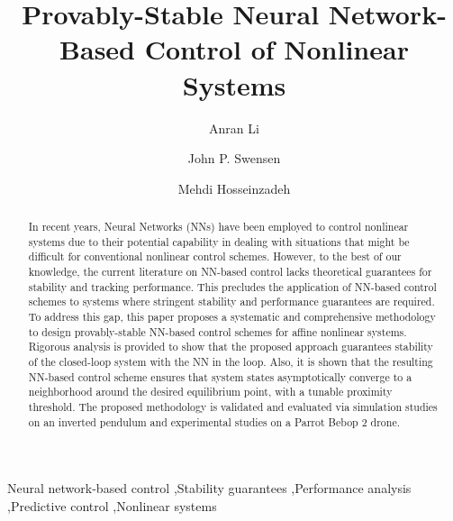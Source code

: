 \documentclass[1p,times]{elsarticle}
\begin{document}
\begin{frontmatter}

\title{Provably-Stable Neural Network-Based Control of Nonlinear Systems}



\author{Anran Li}


\author{John P. Swensen}


\author{Mehdi Hosseinzadeh}




\address{School of Mechanical and Materials Engineering, Washington State University, Pullman, WA 99164, USA}



\begin{abstract}
In recent years, Neural Networks (NNs) have been employed to control nonlinear systems due to their potential capability in dealing with situations that might be difficult for conventional nonlinear control schemes. However, to the best of our knowledge, the current literature on NN-based control lacks theoretical guarantees for stability and tracking performance. This precludes the application of NN-based control schemes to systems where stringent stability and performance guarantees are required. To address this gap, this paper proposes a systematic and comprehensive methodology to design provably-stable NN-based control schemes for affine nonlinear systems. Rigorous analysis is provided to show that the proposed approach guarantees stability of the closed-loop system with the NN in the loop. Also, it is shown that the resulting NN-based control scheme ensures that system states asymptotically converge to a neighborhood around the desired equilibrium point, with a tunable proximity threshold. The proposed methodology is validated and evaluated via simulation studies on an inverted pendulum and experimental studies on a Parrot Bebop 2 drone. 
\end{abstract}


\begin{keyword}
Neural network-based control \sep Stability guarantees \sep Performance analysis \sep Predictive control \sep Nonlinear systems
\end{keyword}


\end{frontmatter}
\end{document}
